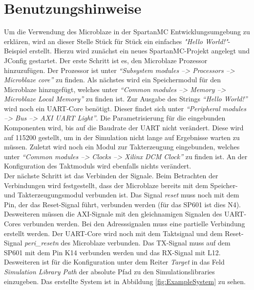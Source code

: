 \chapter{Benutzungshinweise}
Um die Verwendung des Microblaze in der SpartanMC Entwicklungsumgebung zu erklären, wird an dieser Stelle Stück für Stück ein einfaches \textit{"Hello World!"}-Beispiel erstellt.
Hierzu wird zunächst ein neues SpartanMC-Projekt angelegt und JConfig gestartet. Der erste Schritt ist es, den Microblaze Prozessor hinzuzufügen. Der Prozessor ist unter \textit{``Subsystem modules --> Processors --> Microblaze core''} zu finden. Als nächstes wird ein Speichermodul für den Microblaze hinzugefügt, welches unter \textit{``Common modules --> Memory --> Microblaze Local Memory''} zu finden ist. Zur Ausgabe des Strings \textit{``Hello World!''} wird noch ein UART-Core benötigt. Dieser findet sich unter \textit{``Peripheral modules --> Bus --> AXI UART Light''}. Die Parametrisierung für die eingebunden Komponenten wird, bis auf die Baudrate der UART nicht verändert. Diese wird auf 115200 gestellt, um in der Simulation nicht lange auf Ergebnisse warten zu müssen. Zuletzt wird noch ein Modul zur Takterzeugung eingebunden, welches unter \textit{``Common modules --> Clocks --> Xilinx DCM Clock''} zu finden ist. An der Konfiguration des Taktmoduls wird ebenfalls nichts verändert.\\
Der nächste Schritt ist das Verbinden der Signale. Beim Betrachten der Verbindungen wird festgestellt, dass der Microblaze bereits mit dem Speicher- und Takterzeugungsmodul verbunden ist. Das Signal \textit{reset} muss noch mit dem Pin, der das Reset-Signal führt, verbunden werden (für das SP601 ist dies N4). Desweiteren müssen die AXI-Signale mit den gleichnamigen Signalen des UART-Cores verbunden werden. Bei den Adresssignalen muss eine partielle Verbindung erstellt werden. Der UART-Core wird noch mit dem Taktsignal und dem Reset-Signal \textit{peri\_resetn} des Microblaze verbunden. Das TX-Signal muss auf dem SP601 mit dem Pin K14 verbunden werden und das RX-Signal mit L12.\\
Desweiteren ist für die Konfiguration unter dem Reiter \textit{Target} in das Feld \textit{Simulation Library Path} der absolute Pfad zu den Simulationslibraries einzugeben. Das erstellte System ist in Abbildung \ref{fig:ExampleSystem} zu sehen.

